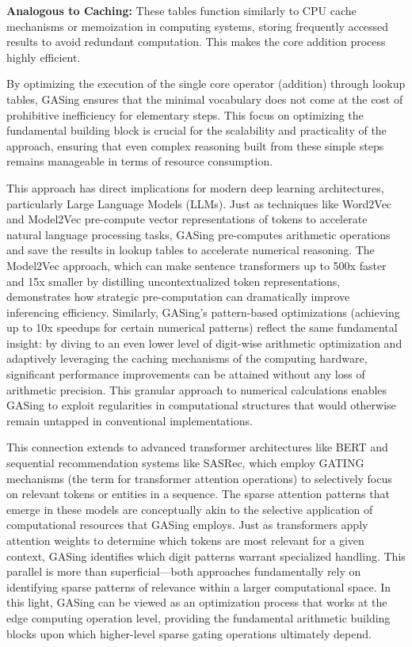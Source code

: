 \noindent\textbf{\textbf{Analogous to Caching}:} These tables function similarly to CPU cache mechanisms or memoization in computing systems, storing frequently accessed results to avoid redundant computation. This makes the core addition process highly efficient.


By optimizing the execution of the single core operator (addition) through lookup tables, GASing ensures that the minimal vocabulary does not come at the cost of prohibitive inefficiency for elementary steps. This focus on optimizing the fundamental building block is crucial for the scalability and practicality of the approach, ensuring that even complex reasoning built from these simple steps remains manageable in terms of resource consumption.

This approach has direct implications for modern deep learning architectures, particularly Large Language Models (LLMs). Just as techniques like Word2Vec and Model2Vec pre-compute vector representations of tokens to accelerate natural language processing tasks, GASing pre-computes arithmetic operations and save the results in lookup tables to accelerate numerical reasoning. The Model2Vec approach, which can make sentence transformers up to 500x faster and 15x smaller by distilling uncontextualized token representations, demonstrates how strategic pre-computation can dramatically improve inferencing efficiency. Similarly, GASing's pattern-based optimizations (achieving up to 10x speedups for certain numerical patterns) reflect the same fundamental insight: by diving to an even lower level of digit-wise arithmetic optimization and adaptively leveraging the caching mechanisms of the computing hardware, significant performance improvements can be attained without any loss of arithmetic precision. This granular approach to numerical calculations enables GASing to exploit regularities in computational structures that would otherwise remain untapped in conventional implementations.

This connection extends to advanced transformer architectures like BERT and sequential recommendation systems like SASRec, which employ GATING mechanisms (the term for transformer attention operations) to selectively focus on relevant tokens or entities in a sequence. The sparse attention patterns that emerge in these models are conceptually akin to the selective application of computational resources that GASing employs. Just as transformers apply attention weights to determine which tokens are most relevant for a given context, GASing identifies which digit patterns warrant specialized handling. This parallel is more than superficial—both approaches fundamentally rely on identifying sparse patterns of relevance within a larger computational space. In this light, GASing can be viewed as an optimization process that works at the edge computing operation level, providing the fundamental arithmetic building blocks upon which higher-level sparse gating operations ultimately depend.

